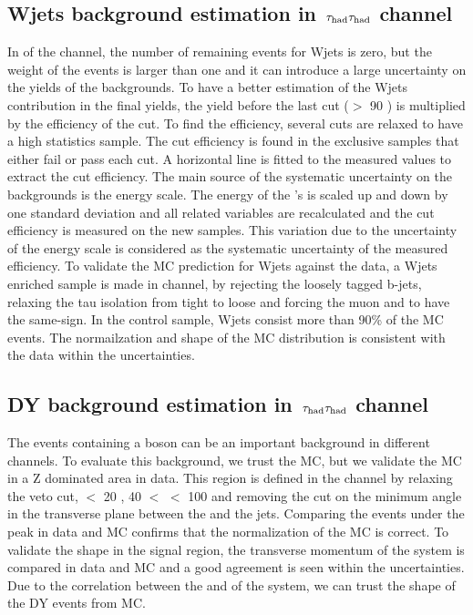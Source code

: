 \subsection{\texorpdfstring{Wjets background estimation in $\,\tau_{\rm had}\tau_{\rm had}$ channel}{Wjets background estimation in tau-tau channel}}
In \binone of the \tauTau channel, the number of remaining events for Wjets is zero, but the weight of the events is larger than one and 
it can introduce a large uncertainty on the yields of the backgrounds. To have a better estimation of the Wjets contribution in the final yields,
the yield before the last cut (\mttwo $>$ 90 \GeV) is multiplied by the efficiency of the cut. To find the efficiency, several cuts are relaxed 
to have a high statistics sample. The cut efficiency is found in the exclusive samples that either fail or pass each cut. 
A horizontal line is fitted to the measured values to extract the cut efficiency. The main source of the systematic uncertainty on the backgrounds 
is the \Tau energy scale. The energy of the \Tau's is scaled up and down by one standard deviation and all related variables are 
recalculated and the cut efficiency is measured on the new samples. 
This variation due to the uncertainty of the \Tau energy scale is considered as the systematic uncertainty of the measured efficiency.
To validate the MC prediction for Wjets against the data, a Wjets enriched sample is made in \muTau channel, 
by rejecting the loosely tagged b-jets, relaxing the tau isolation from tight to loose and forcing the muon and \Tau to have the same-sign. 
In the control sample, Wjets consist more than 90\% of the MC events. The normailzation and shape of the MC distribution  is consistent
with the data within the uncertainties.

\subsection{\texorpdfstring{DY background estimation in $\,\tau_{\rm had}\tau_{\rm had}$ channel}{DY background estimation in tau-tau channel}}
The events containing a \Z boson can be an important background in different channels. To
evaluate this background, we trust the MC, but we validate the MC in a Z dominated area in
data. This region is defined in the \muTau channel by relaxing  the \Z veto cut, \mttwo $<$ 20 \GeV, 40 $<$ \tauMT $<$ 100 \GeV and 
removing the cut on the minimum angle in the transverse plane between the \MET and the jets. Comparing the events under the \Z peak in data and MC 
confirms that the normalization of the  MC is correct. To validate the shape in the signal region, the transverse momentum of the \Z system is compared in data 
and MC  and a good agreement is seen within the uncertainties. Due to the correlation between the \mttwo and \pt of the \Z system, we can trust the shape of the 
DY events from MC.


